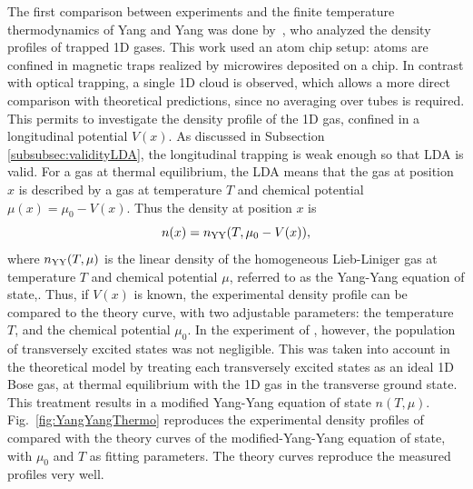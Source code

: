 \documentclass[onecolumn,amsfonts,showpacs,superscriptaddress]{revtex4-1}
\begin{document}
The first comparison between experiments and the finite temperature thermodynamics of Yang and Yang was done by~\cite{van_amerongen_yang-yang_2008}, who analyzed the density profiles of trapped 1D gases.
This work used an atom chip setup:
 atoms are confined in magnetic traps realized by microwires
 deposited on a chip. In contrast with optical trapping, a single 1D cloud is observed, which allows a more direct comparison
 with theoretical predictions, since no averaging over tubes is required.
 This permits to investigate the density profile of the 1D gas, confined in a longitudinal potential $V(x)$. As discussed in
 Subsection \ref{subsubsec:validityLDA}, the longitudinal trapping is weak enough so that 
 LDA is valid. For a gas at thermal equilibrium, the LDA means that
 the gas at position $x$ is 
 described by a gas at temperature $T$
 and chemical potential 
$\mu(x)=\mu_0 - V(x)$. Thus the density at position $x$ is 
 \begin{equation}
     n(x)=n_{{\rm YY}}(T,\mu_0-V(x)),
 \end{equation} 
 where $n_{{\rm YY}}(T,\mu)$ is the linear density of the homogeneous Lieb-Liniger gas at temperature $T$ and chemical potential $\mu$,  referred to as the Yang-Yang equation of state,.
 Thus, if $V(x)$ is known, the experimental density profile can be compared to the theory curve, with two adjustable parameters: the temperature $T$, and the chemical potential $\mu_0$. In the experiment of \cite{van_amerongen_yang-yang_2008}, however, the population of transversely excited states was not negligible. This was taken into account in the theoretical model by
 treating each transversely excited states as an ideal 1D Bose gas, at thermal
 equilibrium with the 1D gas in the transverse ground state.
 This treatment results in a modified Yang-Yang equation of state $n(T,\mu)$. Fig.~\ref{fig:YangYangThermo} reproduces the experimental density profiles of \citep{van_amerongen_yang-yang_2008} compared with the theory curves of the modified-Yang-Yang equation of state, with $\mu_0$ and $T$ as fitting parameters. The theory curves reproduce the measured profiles very well. 
 
\end{document}
